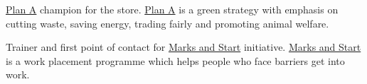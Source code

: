 \begin{cventries}
{\begin{cvitems}
        \item {\href{https://corporate.marksandspencer.com/plan-a}{Plan A} champion for the store. \href{https://corporate.marksandspencer.com/plan-a}{Plan A} is a green strategy with emphasis on cutting waste, saving energy, trading fairly and promoting animal welfare.}
        \item {Trainer and first point of contact for \href{http://careers.marksandspencer.com/helping-you-find-work}{Marks and Start} initiative. \href{http://careers.marksandspencer.com/helping-you-find-work}{Marks and Start} is a work placement programme which helps people who face barriers get into work.}
      \end{cvitems}
    }
\end{cventries}
